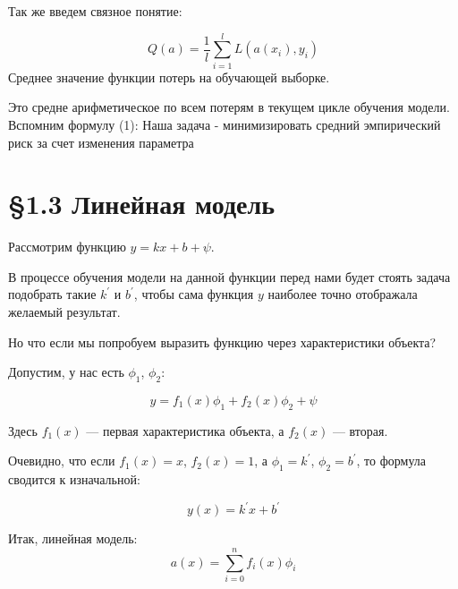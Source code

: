 \vspace{0.5cm}

Так же введем связное понятие:
\begin{tcolorbox}[colback=gray!10, colframe=black, title=Средний эмпирический риск]
\[
    Q(a) = \frac{1}{l} \sum_{i=1}^l L(a(x_i), y_i)
\]
Среднее значение функции потерь на обучающей выборке.
\end{tcolorbox}


    Это средне арифметическое по всем потерям в текущем цикле обучения модели. \\
    \vspace{0.5cm}
    Вспомним формулу (1):
    Наша задача - минимизировать средний эмпирический риск за счет изменения параметра \Delta \\
\vspace{1.5cm}




\centering
\section*{\S 1.3 Линейная модель}
\vspace{0.8cm}
\raggedright

Рассмотрим функцию \( y = kx + b + \psi \).

В процессе обучения модели на данной функции перед нами
будет стоять задача подобрать такие \( k^{\prime} \) и \( b^{\prime} \),
чтобы сама функция \( y \) наиболее точно отображала желаемый результат.

\vspace{0.5cm}

Но что если мы попробуем выразить функцию через характеристики объекта?

Допустим, у нас есть \( \phi_1 \), \( \phi_2 \):

\[
    y = f_1(x)\phi_1 + f_2(x)\phi_2 + \psi
\]

Здесь \( f_1(x) \) — первая характеристика объекта, а \( f_2(x) \) — вторая.

Очевидно, что если \( f_1(x) = x \), \( f_2(x) = 1 \), а \( \phi_1 = k^{\prime} \), \( \phi_2 = b^{\prime} \),
то формула сводится к изначальной:

\[
    y(x) = k^{\prime}x + b^{\prime}
\]

Итак, линейная модель:
\[
    a(x) = \sum_{i=0}^{n} f_i(x)\phi_i
\]

